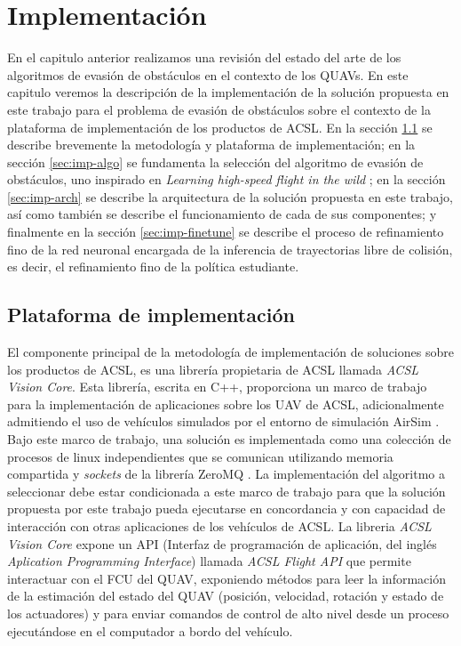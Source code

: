 \chapter{Implementación}
\label{capitulo5}

En el capitulo anterior realizamos una revisión del estado del arte de los algoritmos de evasión de obstáculos en el contexto de los QUAVs. En este capitulo veremos la descripción de la implementación de la solución propuesta en este trabajo para el problema de evasión de obstáculos sobre el contexto de la plataforma de implementación de los productos de ACSL. En la sección \ref{sec:imp-platform} se describe brevemente la metodología y plataforma de implementación; en la sección \ref{sec:imp-algo} se fundamenta la selección del algoritmo de evasión de obstáculos, uno inspirado en \textit{Learning high-speed flight in the wild} \cite{Loquercio2021}; en la sección \ref{sec:imp-arch} se describe la arquitectura de la solución propuesta en este trabajo, así como también se describe el funcionamiento de cada de sus componentes; y finalmente en la sección \ref{sec:imp-finetune} se describe el proceso de refinamiento fino de la red neuronal encargada de la inferencia de trayectorias libre de colisión, es decir, el refinamiento fino de la política estudiante.

\section{Plataforma de implementación}

\label{sec:imp-platform}

El componente principal de la metodología de implementación de soluciones sobre los productos de ACSL, es una librería propietaria de ACSL llamada \textit{ACSL Vision Core}. Esta librería, escrita en C++, proporciona un marco de trabajo para la implementación de aplicaciones sobre los UAV de ACSL, adicionalmente admitiendo el uso de vehículos simulados por el entorno de simulación AirSim \cite{shah2018airsim}. Bajo este marco de trabajo, una solución es implementada como una colección de procesos de linux independientes que se comunican utilizando memoria compartida y \textit{sockets} de la librería ZeroMQ \cite{zeroMQ}. La implementación del algoritmo a seleccionar debe estar condicionada a este marco de trabajo para que la solución propuesta por este trabajo pueda ejecutarse en concordancia y con capacidad de interacción con otras aplicaciones de los vehículos de ACSL. La libreria \textit{ACSL Vision Core} expone un API (Interfaz de programación de aplicación, del inglés \textit{Aplication Programming Interface}) llamada \textit{ACSL Flight API} que permite interactuar con el FCU del QUAV, exponiendo métodos para leer la información de la estimación del estado del QUAV (posición, velocidad, rotación y estado de los actuadores) y para enviar comandos de control de alto nivel desde un proceso ejecutándose en el computador a bordo del vehículo.

